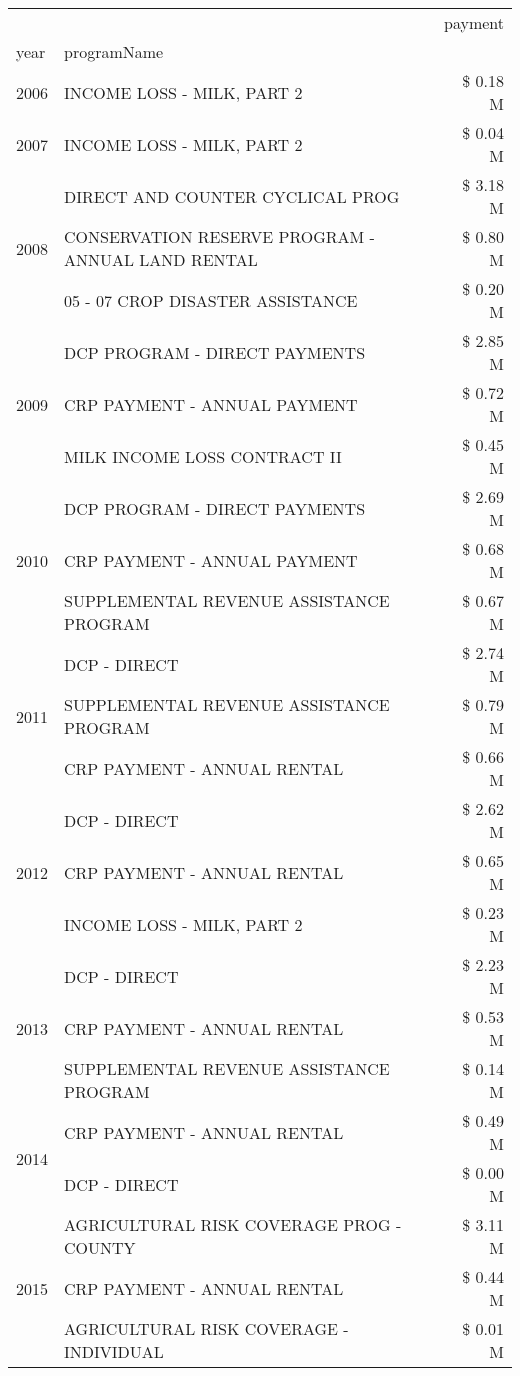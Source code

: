 \begin{tabular}{llr}
\toprule
 &  & payment \\
year & programName &  \\
\midrule
2006 & INCOME LOSS - MILK, PART 2 & \$ 0.18 M \\
\cline{1-3}
2007 & INCOME LOSS - MILK, PART 2 & \$ 0.04 M \\
\cline{1-3}
\multirow[t]{3}{*}{2008} & DIRECT AND COUNTER CYCLICAL PROG & \$ 3.18 M \\
 & CONSERVATION RESERVE PROGRAM - ANNUAL LAND RENTAL & \$ 0.80 M \\
 & 05 - 07 CROP DISASTER ASSISTANCE & \$ 0.20 M \\
\cline{1-3}
\multirow[t]{3}{*}{2009} & DCP PROGRAM - DIRECT PAYMENTS & \$ 2.85 M \\
 & CRP PAYMENT - ANNUAL PAYMENT & \$ 0.72 M \\
 & MILK INCOME LOSS CONTRACT II & \$ 0.45 M \\
\cline{1-3}
\multirow[t]{3}{*}{2010} & DCP PROGRAM - DIRECT PAYMENTS & \$ 2.69 M \\
 & CRP PAYMENT - ANNUAL PAYMENT & \$ 0.68 M \\
 & SUPPLEMENTAL REVENUE ASSISTANCE PROGRAM & \$ 0.67 M \\
\cline{1-3}
\multirow[t]{3}{*}{2011} & DCP - DIRECT & \$ 2.74 M \\
 & SUPPLEMENTAL REVENUE ASSISTANCE PROGRAM & \$ 0.79 M \\
 & CRP PAYMENT - ANNUAL RENTAL & \$ 0.66 M \\
\cline{1-3}
\multirow[t]{3}{*}{2012} & DCP - DIRECT & \$ 2.62 M \\
 & CRP PAYMENT - ANNUAL RENTAL & \$ 0.65 M \\
 & INCOME LOSS - MILK, PART 2 & \$ 0.23 M \\
\cline{1-3}
\multirow[t]{3}{*}{2013} & DCP - DIRECT & \$ 2.23 M \\
 & CRP PAYMENT - ANNUAL RENTAL & \$ 0.53 M \\
 & SUPPLEMENTAL REVENUE ASSISTANCE PROGRAM & \$ 0.14 M \\
\cline{1-3}
\multirow[t]{2}{*}{2014} & CRP PAYMENT - ANNUAL RENTAL & \$ 0.49 M \\
 & DCP - DIRECT & \$ 0.00 M \\
\cline{1-3}
\multirow[t]{3}{*}{2015} & AGRICULTURAL RISK COVERAGE PROG - COUNTY & \$ 3.11 M \\
 & CRP PAYMENT - ANNUAL RENTAL & \$ 0.44 M \\
 & AGRICULTURAL RISK COVERAGE - INDIVIDUAL & \$ 0.01 M \\

\end{tabular}
